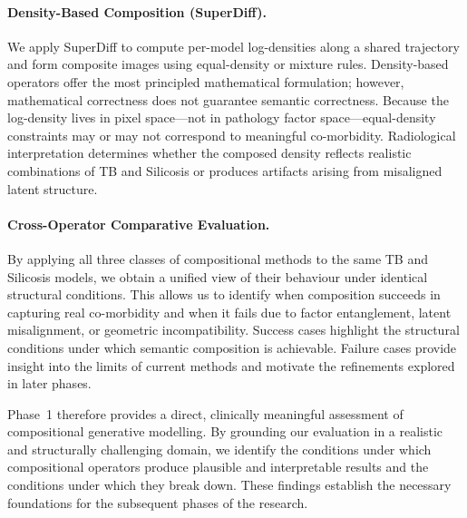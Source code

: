 \paragraph{Density-Based Composition (SuperDiff).}
We apply SuperDiff to compute per-model log-densities along a shared trajectory and
form composite images using equal-density or mixture rules. Density-based operators
offer the most principled mathematical formulation; however, mathematical correctness
does not guarantee semantic correctness. Because the log-density lives in pixel
space—not in pathology factor space—equal-density constraints may or may not
correspond to meaningful co-morbidity. Radiological interpretation determines whether
the composed density reflects realistic combinations of TB and Silicosis or produces
artifacts arising from misaligned latent structure.

\paragraph{Cross-Operator Comparative Evaluation.}
By applying all three classes of compositional methods to the same TB and Silicosis
models, we obtain a unified view of their behaviour under identical structural
conditions. This allows us to identify when composition succeeds in capturing real
co-morbidity and when it fails due to factor entanglement, latent misalignment, or
geometric incompatibility. Success cases highlight the structural conditions under
which semantic composition is achievable. Failure cases provide insight into the
limits of current methods and motivate the refinements explored in later phases.

Phase~1 therefore provides a direct, clinically meaningful assessment of
compositional generative modelling. By grounding our evaluation in a realistic and
structurally challenging domain, we identify the conditions under which compositional
operators produce plausible and interpretable results and the conditions under which
they break down. These findings establish the necessary foundations for the
subsequent phases of the research.

